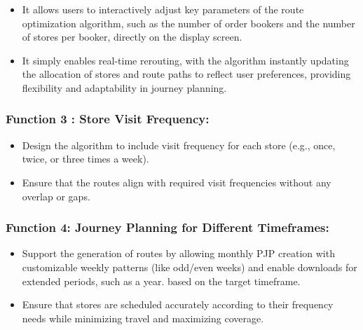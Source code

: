     \begin{itemize}
        \item It allows users to interactively adjust key parameters of the route optimization algorithm, such as the number of order bookers and the number of stores per booker, directly on the display screen.
        \item It simply enables real-time rerouting, with the algorithm instantly updating the allocation of stores and route paths to reflect user preferences, providing flexibility and adaptability in journey planning.
    \end{itemize}

 


\subsubsection*{Function 3 : Store Visit Frequency: 
}

\begin{itemize}
    \item Design the algorithm to include visit frequency for each store (e.g., once, twice, or three times a week).
    \item Ensure that the routes align with required visit frequencies without any overlap or gaps.
\end{itemize}

\subsubsection*{Function 4: Journey Planning for Different Timeframes: 
}

\begin{itemize}
    \item Support the generation of routes 
by allowing monthly PJP creation with customizable weekly patterns (like odd/even weeks) and enable downloads for extended periods, such as a year. based on the target timeframe.
    \item Ensure that stores are scheduled accurately according to their frequency needs while minimizing travel and maximizing coverage.
\end{itemize}



 

